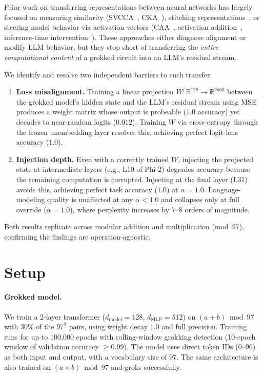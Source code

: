 \documentclass{article}
\begin{document}
Prior work on transferring representations between neural networks has
largely focused on measuring similarity
(SVCCA~\cite{raghu2017svcca}, CKA~\cite{kornblith2019cka}),
stitching representations~\cite{bansal2021stitching,merullo2024stitching},
or steering model behavior via activation vectors
(CAA~\cite{rimsky2024caa},
activation addition~\cite{turner2023activation},
inference-time intervention~\cite{li2023inference}).
These approaches either diagnose alignment or modify LLM behavior, but they
stop short of transferring the \emph{entire computational content} of a
grokked circuit into an LLM's residual stream.

We identify and resolve two independent barriers to such transfer:
\begin{enumerate}[leftmargin=*,nosep]
\item \textbf{Loss misalignment.} Training a linear projection $W: \mathbb{R}^{128}
  \rightarrow \mathbb{R}^{2560}$ between the grokked model's hidden state and the
  LLM's residual stream using MSE produces a weight matrix whose output is
  probeable ($1.0$ accuracy) yet decodes to near-random logits
  ($0.012$).  Training $W$ via cross-entropy through the frozen unembedding
  layer resolves this, achieving perfect logit-lens accuracy ($1.0$).

\item \textbf{Injection depth.} Even with a correctly trained $W$, injecting the
  projected state at intermediate layers (e.g., L10 of Phi-2) degrades accuracy
  because the remaining computation is corrupted.  Injecting at the final layer
  (L31) avoids this, achieving perfect task accuracy ($1.0$) at $\alpha = 1.0$.
  Language-modeling quality is unaffected at any $\alpha < 1.0$ and collapses
  only at full override ($\alpha = 1.0$), where perplexity increases by
  7--8 orders of magnitude.
\end{enumerate}

Both results replicate across modular addition and multiplication (mod~97),
confirming the findings are operation-agnostic.

\section{Setup}
\label{sec:setup}

\paragraph{Grokked model.}
We train a 2-layer transformer ($d_{\text{model}}=128$, $d_{\text{MLP}}=512$)
on $(a + b) \bmod 97$ with 30\% of the $97^2$ pairs, using weight decay $1.0$
and full precision.  Training runs for up to 100,000 epochs with rolling-window
grokking detection (10-epoch window of validation accuracy $\geq 0.99$).  The
model uses direct token IDs (0--96) as both input and output, with a
vocabulary size of 97.  The same architecture is also trained on
$(a \times b) \bmod 97$ and groks successfully.
\end{document}
